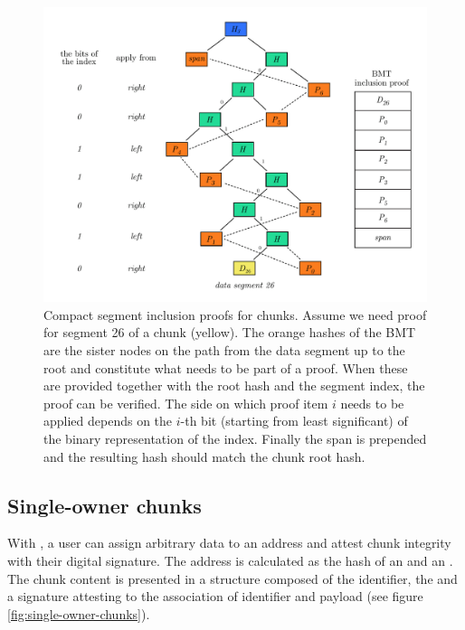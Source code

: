 \begin{figure}[htbp]
\centering
\includegraphics[width=\textwidth]{fig/inclusion-proof.pdf}
\caption[Compact segment inclusion proofs for chunks \statusgreen]{Compact segment inclusion proofs for chunks. Assume we need proof for segment 26 of a chunk (yellow). The orange hashes of the BMT are the sister nodes on the path from the data segment up to the root and constitute what needs to be part of a proof. When these are provided together with the root hash and the segment index, the proof can be verified. The side on which proof item $i$ needs to be applied depends on the $i$-th bit (starting from least significant) of the binary representation of the index. Finally the span is prepended and the resulting hash should match the chunk root hash.}
\label{fig:chunk-inclusion}
\end{figure}


\subsection{Single-owner chunks\statusgreen}\label{sec:single-owner-chunks}

With , a user can assign arbitrary data to an address and attest chunk integrity with their digital signature. The address is calculated as the hash of an  and an . The chunk content is presented in a  structure composed of the identifier, the  and a signature attesting to the association of identifier and payload (see figure \ref{fig:single-owner-chunks}).

